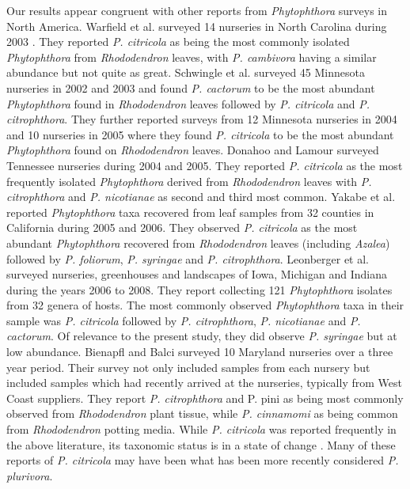 \documentclass[12pt]{article}
\begin{document}
Our results appear congruent with other reports from \emph{Phytophthora} surveys in North America.  Warfield et al. surveyed 14 nurseries in North Carolina during 2003 \cite{warfield_etal_2008}.  They reported \emph{P. citricola} as being the most commonly isolated \emph{Phytophthora} from \emph{Rhododendron} leaves, with \emph{P. cambivora} having a similar abundance but not quite as great.  Schwingle et al.\cite{schwingle_etal_2007} surveyed 45 Minnesota nurseries in 2002 and 2003 and found \emph{P. cactorum} to be the most abundant \emph{Phytophthora} found in \emph{Rhododendron} leaves followed by \emph{P. citricola} and \emph{P. citrophthora}.  They further reported surveys from 12 Minnesota nurseries in 2004 and 10 nurseries in 2005 where they found \emph{P. citricola} to be the most abundant \emph{Phytophthora} found on \emph{Rhododendron} leaves.  Donahoo and Lamour surveyed Tennessee nurseries during 2004 and 2005\cite{donahoo_lamour_2008}.  They reported \emph{P. citricola} as the most frequently isolated \emph{Phytophthora} derived from \emph{Rhododendron} leaves with \emph{P. citrophthora} and \emph{P. nicotianae} as second and third most common.  Yakabe et al. \cite{yakabe_etal_2009} reported \emph{Phytophthora} taxa recovered from leaf samples from 32 counties in California during 2005 and 2006.  They observed \emph{P. citricola} as the most abundant \emph{Phytophthora} recovered from \emph{Rhododendron} leaves (including \emph{Azalea}) followed by \emph{P. foliorum}, \emph{P. syringae} and \emph{P. citrophthora}.  Leonberger et al. \cite{leonberger_etal_2013} surveyed nurseries, greenhouses and landscapes of Iowa, Michigan and Indiana during the years 2006 to 2008.  They report collecting 121 \emph{Phytophthora} isolates from 32 genera of hosts.  The most commonly observed \emph{Phytophthora} taxa in their sample was \emph{P. citricola} followed by \emph{P. citrophthora}, \emph{P. nicotianae} and \emph{P. cactorum}.  Of relevance to the present study, they did observe \emph{P. syringae} but at low abundance.  Bienapfl and Balci \cite{bienapfl_balci_2013} surveyed 10 Maryland nurseries over a three year period.  Their survey not only included samples from each nursery but included samples which had recently arrived at the nurseries, typically from West Coast suppliers.  They report \emph{P. citrophthora} and {P. pini} as being most commonly observed from \emph{Rhododendron} plant tissue, while \emph{P. cinnamomi} as being common from \emph{Rhododendron} potting media.  While \emph{P. citricola} was reported frequently in the above literature, its taxonomic status is in a state of change \cite{jung_burgess_2009}.  Many of these reports of \emph{P. citricola} may have been what has been more recently considered \emph{P. plurivora}. 
\end{document}
